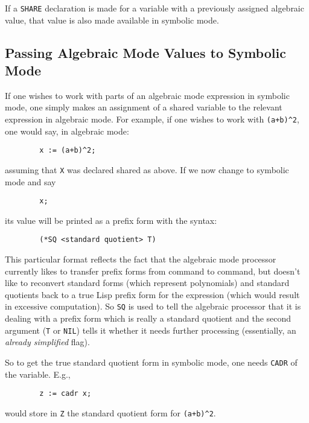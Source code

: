 \documentclass[11pt,letterpaper]{book}
\begin{document}
If a {\tt SHARE} declaration is made for a variable with a previously
assigned algebraic value, that value is also made available in symbolic
mode.

\subsection{Passing Algebraic Mode Values to Symbolic Mode}

If one wishes to work with parts of an algebraic mode
 expression in symbolic mode,
one simply makes an assignment of a shared variable to
the relevant expression in algebraic mode.  For example, if one wishes to
work with {\tt (a+b)\verb|^|2}, one would say, in algebraic mode:
{\small\begin{verbatim}
        x := (a+b)^2;
\end{verbatim}}
assuming that {\tt X} was declared shared as above.  If we now change to
symbolic mode and say
{\small\begin{verbatim}
        x;
\end{verbatim}}
its value will be printed as a prefix form with the syntax:
{\small\begin{verbatim}
        (*SQ <standard quotient> T)
\end{verbatim}}
This particular format reflects the fact that the algebraic mode processor
currently likes to transfer prefix forms from command to command, but
doesn't like to reconvert standard forms (which
represent polynomials) and standard quotients back to a true Lisp prefix
form for the expression (which would result in excessive computation).  So
{\tt *SQ} is used to tell the algebraic processor that it is dealing with
a prefix form which is really a standard quotient and the second argument ({\tt T} or {\tt NIL}) tells it whether
it needs further processing (essentially, an {\em already simplified\/}
flag).

So to get the true standard quotient form in symbolic mode, one needs
{\tt CADR} of the variable. E.g.,
{\small\begin{verbatim}
        z := cadr x;
\end{verbatim}}
would store in {\tt Z} the standard quotient form for {\tt (a+b)\verb|^|2}.
\end{document}
